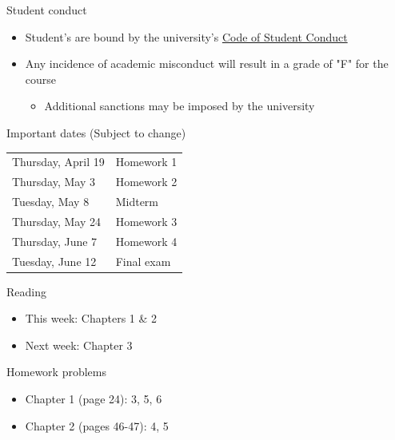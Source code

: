 \documentclass[10pt]{beamer}
\begin{document}
\begin{frame}[label={sec:org20b5cec}]{}
\alert{Student conduct}
\begin{itemize}
\item Student's are bound by the university's \href{http://studentlife.oregonstate.edu/sites/studentlife.oregonstate.edu/files/code\_of\_student\_conduct.pdf}{Code of Student Conduct}
\item Any incidence of academic misconduct will result in a grade of "F" for the course 
\begin{itemize}
\item Additional sanctions may be imposed by the university
\end{itemize}
\end{itemize}
\end{frame}

\begin{frame}[label={sec:org95d9c05}]{}
\alert{Important dates}
(Subject to change)
\begin{center}
\begin{tabular}{ll}
Thursday, April 19 & Homework 1\\
Thursday, May 3 & Homework 2\\
Tuesday, May 8 & Midterm\\
Thursday, May 24 & Homework 3\\
Thursday, June 7 & Homework 4\\
Tuesday, June 12 & Final exam\\
\end{tabular}
\end{center}
\end{frame}

\begin{frame}[label={sec:orgc10eee4}]{}
\alert{Reading}
\begin{itemize}
\item This week: Chapters 1 \& 2
\item Next week: Chapter 3
\end{itemize}
\end{frame}

\begin{frame}[label={sec:org150aa49}]{}
\alert{Homework problems}
\begin{itemize}
\item Chapter 1 (page 24): 3, 5, 6
\item Chapter 2 (pages 46-47): 4, 5
\end{itemize}
\end{frame}
\end{document}

